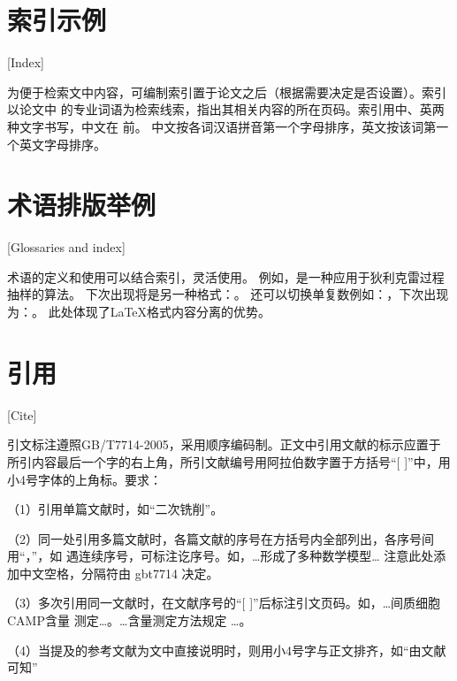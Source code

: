 \section{索引示例}[Index]

为便于检索文中内容，可编制索引置于论文之后（根据需要决定是否设置）。索引以论文中
的专业词语为检索线索，指出其相关内容的所在页码。索引用中、英两种文字书写，中文在
前。
中文按各词汉语拼音第一个字母排序，英文按该词第一个英文字母排序。

\section{术语排版举例}[Glossaries and index]

术语的定义和使用可以结合索引，灵活使用。
例如，是一种应用于狄利克雷过程抽样的算法。
下次出现将是另一种格式：。
还可以切换单复数例如：，下次出现为：。
此处体现了\LaTeX{}格式内容分离的优势。

\section{引用}[Cite]

引文标注遵照GB/T7714-2005，采用顺序编码制。正文中引用文献的标示应置于所引内容最后一个字的右上角，所引文献编号用阿拉伯数字置于方括号“[ ]”中，用小4号字体的上角标。要求：

（1）引用单篇文献时，如“二次铣削\cite{cnproceed}”。

（2）同一处引用多篇文献时，各篇文献的序号在方括号内全部列出，各序号间用“，”，如
遇连续序号，可标注讫序号。如，…形成了多种数学模型\cite{cnarticle,cnproceed}…
注意此处添加中文空格，分隔符由 gbt7714 决定。

（3）多次引用同一文献时，在文献序号的“[ ]”后标注引文页码。如，…间质细胞CAMP含量
测定\cite[100-197]{cnarticle}…。…含量测定方法规定
\cite[92]{cnarticle}…。

（4）当提及的参考文献为文中直接说明时，则用小4号字与正文排齐，如“由文献可知”


